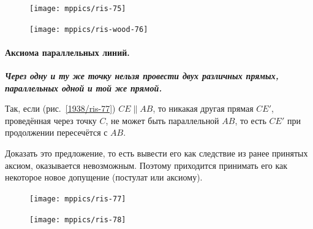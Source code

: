 \documentclass[twoside]{book}
\begin{document}
\begin{figure}[h!]
\begin{minipage}{.28\textwidth}
\centering
\texttt{[image: mppics/ris-75]}
\end{minipage}\hfill
\begin{minipage}{.58\textwidth}
\centering
\texttt{[image: mppics/ris-wood-76]}
\end{minipage}

\medskip

\begin{minipage}{.32\textwidth}
\centering
{}\label{1938/ris-75}
\end{minipage}\hfill
\begin{minipage}{.54\textwidth}
\centering
\caption{}\label{1938/ris-76}
\end{minipage}
\vskip-4mm
\end{figure}

\paragraph{Аксиома параллельных линий.}\label{1938/75}
\textbf{\emph{Через одну и ту же точку нельзя провести двух различных прямых, параллельных одной и той же прямой.}}

Так, если (рис.~\ref{1938/ris-77}) $CE\parallel AB$, то никакая другая прямая $CE'$, проведённая через точку $C$, не может быть параллельной $AB$, то есть $CE'$ при продолжении пересечётся с $AB$.

Доказать это предложение, то есть вывести его как следствие из ранее принятых аксиом, оказывается невозможным.
Поэтому приходится принимать его как некоторое новое допущение (постулат или аксиому).

\begin{figure}[h!]
\begin{minipage}{.48\textwidth}
\centering
\texttt{[image: mppics/ris-77]}
\end{minipage}\hfill
\begin{minipage}{.48\textwidth}
\centering
\texttt{[image: mppics/ris-78]}
\end{minipage}

\medskip

\begin{minipage}{.48\textwidth}
\centering
\caption{}\label{1938/ris-77}
\end{minipage}\hfill
\begin{minipage}{.48\textwidth}
\centering
\caption{}\label{1938/ris-78}
\end{minipage}
\vskip-4mm
\end{figure}
\end{document}
